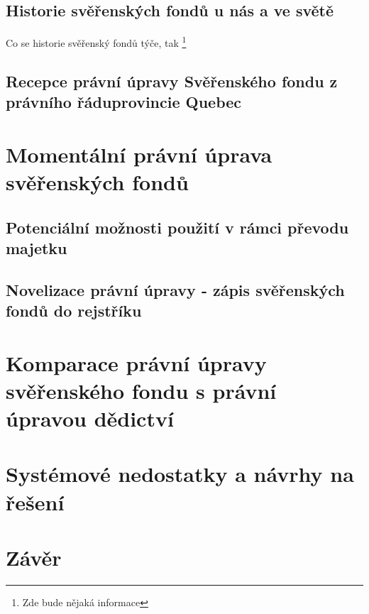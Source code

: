 \documentclass{article}
\begin{document}
\subsection{Historie svěřenských fondů u nás a ve světě}

Co se historie svěřenský fondů týče, tak \footnote[4]{Zde bude nějaká informace}

\subsection{Recepce právní úpravy Svěřenského fondu z právního řáduprovincie Quebec}

\newpage
\thispagestyle{smallertextinheader}

\section{Momentální právní úprava svěřenských fondů}

\subsection{Potenciální možnosti použití v rámci převodu majetku}

\subsection{Novelizace právní úpravy - zápis svěřenských fondů do rejstříku}

\newpage

\thispagestyle{smallertextinheader}

\section{Komparace právní úpravy svěřenského fondu s právní úpravou dědictví}

\newpage

\section{Systémové nedostatky a návrhy na řešení}

\newpage

\section{Závěr}

\newpage
\printbibheading
\printbibliography[type=misc,heading=subbibliography,title={Online sources}]
\printbibliography[type=book,heading=subbibliography,title={Other sources}]
	
\end{document}
